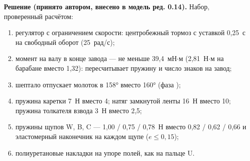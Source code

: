 \noindent\textbf{Решение (принято автором, внесено в модель ред. 0.14).} Набор, проверенный расчётом:
\begin{enumerate}
  \item регулятор с ограничением скорости: центробежный тормоз с уставкой 0,25~с на свободный оборот (25~рад/с);
  \item момент на валу в конце завода — не меньше 39,4~мН$\cdot$м (2,81~Н$\cdot$м на барабане вместо 1,32):  пересчитывает пружину и число знаков на завод;
  \item шептало отпускает молоток в 158° вместо 160° (фаза );
  \item пружина каретки 7~Н вместо 4; натяг замкнутой ленты 16~Н вместо 10; пружина толкателя взвода 3~Н вместо 2,5;
  \item пружины щупов W, B, C — 1,00 / 0,75 / 0,78~Н вместо 0,82 / 0,62 / 0,66 и эластомерный наконечник на каждом щупе ($e \le 0{,}15$);
  \item полиуретановые накладки на упоре полей, как на пальце U.
\end{enumerate}
